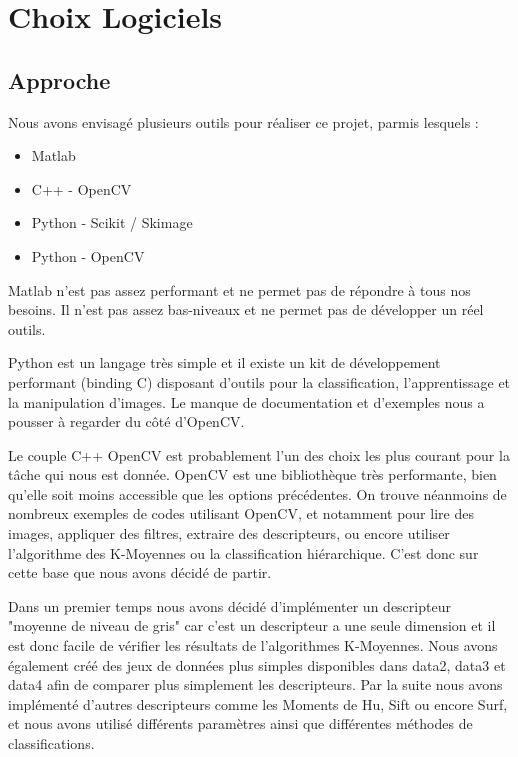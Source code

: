 \documentclass[12pt,a4paper,utf8x]{report}
\begin{document}
\chapter{Choix Logiciels}

\section{Approche}
    Nous avons envisagé plusieurs outils pour réaliser ce projet, parmis lesquels :

    \begin{itemize}
        \item Matlab
        \item C++ - OpenCV
        \item Python - Scikit / Skimage
        \item Python - OpenCV
    \end{itemize}

    Matlab n'est pas assez performant et ne permet pas de répondre à tous nos besoins. Il n'est pas assez bas-niveaux et ne permet pas de développer un réel outils.

    Python est un langage très simple et il existe un kit de développement performant (binding C) disposant d'outils pour la classification, l'apprentissage et la manipulation d'images. Le manque de documentation et d'exemples nous a pousser à regarder du côté d'OpenCV.

    Le couple C++ OpenCV est probablement l'un des choix les plus courant pour la tâche qui nous est donnée. OpenCV est une bibliothèque très performante, bien qu'elle soit moins accessible que les options précédentes. On trouve néanmoins de nombreux exemples de codes utilisant OpenCV, et notamment pour lire des images, appliquer des filtres, extraire des descripteurs, ou encore utiliser l'algorithme des K-Moyennes ou la classification hiérarchique. C'est donc sur cette base que nous avons décidé de partir.

    Dans un premier temps nous avons décidé d'implémenter un descripteur "moyenne de niveau de gris" car c'est un descripteur a une seule dimension et il est donc facile de vérifier les résultats de l'algorithmes K-Moyennes. Nous avons également créé des jeux de données plus simples disponibles dans data2, data3 et data4 afin de comparer plus simplement les descripteurs. Par la suite nous avons implémenté d'autres descripteurs comme les Moments de Hu, Sift ou encore Surf, et nous avons utilisé différents paramètres ainsi que différentes méthodes de classifications.
\end{document}
